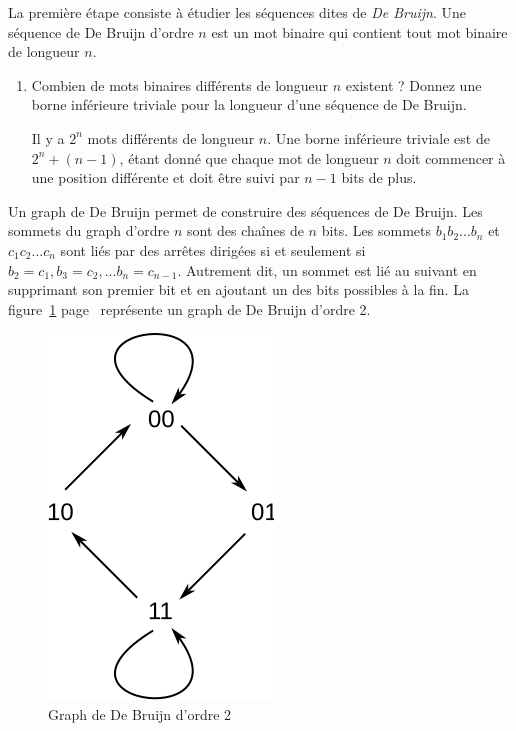\documentclass[11pt]{article}
\begin{document}
La première étape consiste à étudier les séquences dites de \emph{De Bruijn}.
Une séquence de De Bruijn d'ordre $n$ est un mot binaire qui contient
tout mot binaire de longueur $n$.

\begin{enumerate}
\item Combien de mots binaires différents de longueur $n$ existent ?
 Donnez une borne inférieure triviale pour la longueur d'une séquence
 de De Bruijn.

\begin{solution}
Il y a $2^n$ mots différents de longueur $n$. 
Une borne inférieure triviale est de $2^n+(n-1)$, étant donné que chaque mot
de longueur $n$ doit commencer à une position différente et doit être suivi
par $n-1$ bits de plus.
\end{solution}
\end{enumerate}

Un graph de De Bruijn permet de construire des
séquences de De Bruijn. Les sommets du graph d'ordre $n$ sont des chaînes de
$n$ bits. Les sommets $b_1b_2...b_n$ et $c_1c_2...c_n$ sont liés par des
arrêtes dirigées si et seulement si $b_2=c_1,b_3=c_2,...b_n=c_{n-1}$.
Autrement dit, un sommet est lié au suivant en
supprimant son premier bit et en ajoutant un des bits possibles à la fin.
La figure~\ref{DeBruijnOrdre2} page~\pageref{DeBruijnOrdre2} représente
un graph de De Bruijn d'ordre 2.

\begin{figure}[h]
 \centering
 \includegraphics{order-2}
 \caption{\label{DeBruijnOrdre2}Graph de De Bruijn d'ordre 2}
\end{figure}
\end{document}
